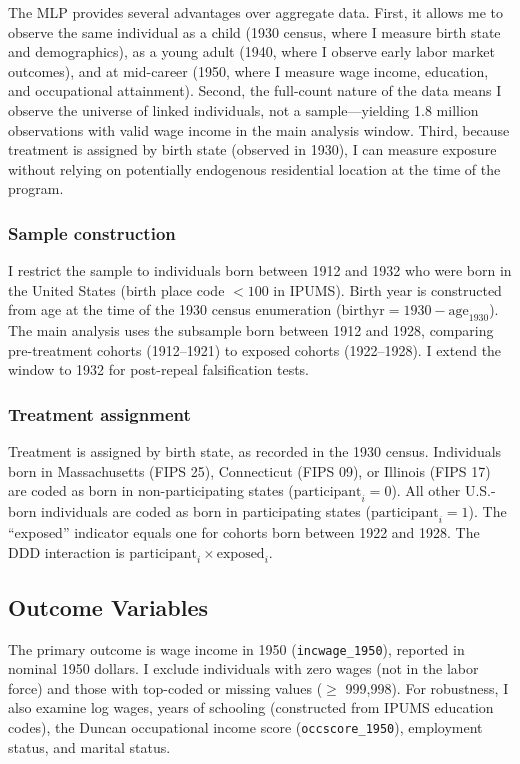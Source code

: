 \documentclass[12pt]{article}
\begin{document}
The MLP provides several advantages over aggregate data. First, it allows me to observe the same individual as a child (1930 census, where I measure birth state and demographics), as a young adult (1940, where I observe early labor market outcomes), and at mid-career (1950, where I measure wage income, education, and occupational attainment). Second, the full-count nature of the data means I observe the universe of linked individuals, not a sample---yielding 1.8 million observations with valid wage income in the main analysis window. Third, because treatment is assigned by birth state (observed in 1930), I can measure exposure without relying on potentially endogenous residential location at the time of the program.

\subsubsection*{Sample construction} I restrict the sample to individuals born between 1912 and 1932 who were born in the United States (birth place code $< 100$ in IPUMS). Birth year is constructed from age at the time of the 1930 census enumeration ($\text{birthyr} = 1930 - \text{age}_{1930}$). The main analysis uses the subsample born between 1912 and 1928, comparing pre-treatment cohorts (1912--1921) to exposed cohorts (1922--1928). I extend the window to 1932 for post-repeal falsification tests.

\subsubsection*{Treatment assignment} Treatment is assigned by birth state, as recorded in the 1930 census. Individuals born in Massachusetts (FIPS 25), Connecticut (FIPS 09), or Illinois (FIPS 17) are coded as born in non-participating states ($\text{participant}_i = 0$). All other U.S.-born individuals are coded as born in participating states ($\text{participant}_i = 1$). The ``exposed'' indicator equals one for cohorts born between 1922 and 1928. The DDD interaction is $\text{participant}_i \times \text{exposed}_i$.

\subsection{Outcome Variables}

The primary outcome is wage income in 1950 (\texttt{incwage\_1950}), reported in nominal 1950 dollars. I exclude individuals with zero wages (not in the labor force) and those with top-coded or missing values ($\geq$ 999,998). For robustness, I also examine log wages, years of schooling (constructed from IPUMS education codes), the Duncan occupational income score (\texttt{occscore\_1950}), employment status, and marital status.
\end{document}
